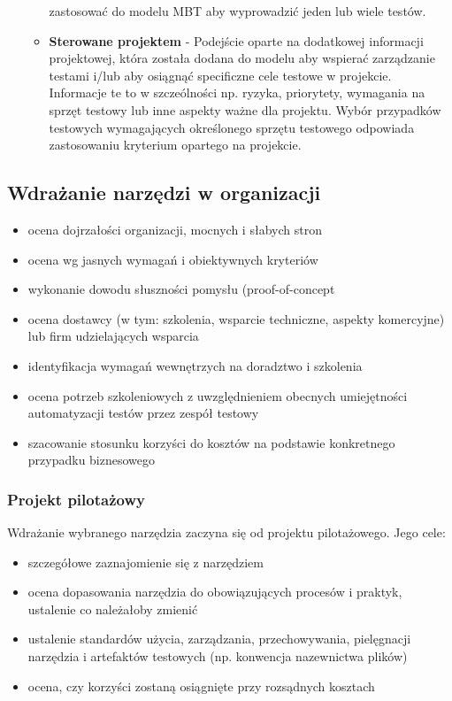 \documentclass[../main.tex]{subfiles}
\begin{document}
\begin{itemize}
\begin{itemize}
            zastosować do modelu MBT aby wyprowadzić jeden lub wiele testów.
            \item \textbf{Sterowane projektem} - Podejście oparte na dodatkowej informacji projektowej, która została
            dodana do modelu aby wspierać zarządzanie testami i/lub aby osiągnąć specificzne cele testowe w projekcie.
            Informacje te to w szczeólności np. ryzyka, priorytety, wymagania na sprzęt testowy lub inne aspekty ważne dla projektu.
            Wybór przypadków testowych wymagających określonego sprzętu testowego odpowiada zastosowaniu kryterium opartego na projekcie.
        \end{itemize}
    \end{itemize}

    \subsection{Wdrażanie narzędzi w organizacji}
    \begin{itemize}
        \item ocena dojrzałości organizacji, mocnych i słabych stron
        \item ocena wg jasnych wymagań i obiektywnych kryteriów
        \item wykonanie dowodu słuszności pomysłu (proof-of-concept
        \item ocena dostawcy (w tym: szkolenia, wsparcie techniczne, aspekty komercyjne) lub firm udzielających wsparcia
        \item identyfikacja wymagań wewnętrzych na doradztwo i szkolenia
        \item ocena potrzeb szkoleniowych z uwzględnieniem obecnych umiejętności automatyzacji testów przez zespół testowy
        \item szacowanie stosunku korzyści do kosztów na podstawie konkretnego przypadku biznesowego
    \end{itemize}

    \subsubsection{Projekt pilotażowy}
    Wdrażanie wybranego narzędzia zaczyna się od
    projektu pilotażowego. Jego cele:
    \begin{itemize}
        \item szczegółowe zaznajomienie się z narzędziem
        \item ocena dopasowania narzędzia do obowiązujących procesów i praktyk, ustalenie co należałoby zmienić
        \item ustalenie standardów użycia, zarządzania, przechowywania, pielęgnacji narzędzia i artefaktów testowych (np. konwencja nazewnictwa plików)
        \item ocena, czy korzyści zostaną osiągnięte przy rozsądnych kosztach
    \end{itemize}
\end{document}
